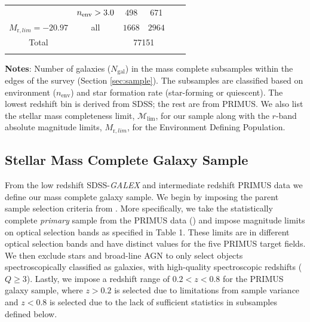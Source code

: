\begin{table}
\begin{center}
\begin{tabular}{cccccc}
                             &$n_{\mathrm{env}} > 3.0 $            &498                       &671                           \\
        $M_{\mathrm{r}, lim} = -20.97$              & all              & $1668$                      & $2964$                          \\ \hline
        Total &      & \multicolumn{2}{c}{77151} & \\ \hline
        \multicolumn{4}{l}{}                                             \\       
    \end{tabular} \par
    \end{center}
    {\bf Notes}: Number of galaxies ($N_{\mathrm{gal}}$) in the mass complete subsamples within the edges of the survey (Section \ref{sec:sample}). The subsamples are classified based on environment ($n_{\mathrm{env}}$) and star formation rate (star-forming or quiescent). The lowest redshift bin is derived from SDSS; the rest are from PRIMUS. We also list the stellar mass completeness limit, $\mathcal{M}_{\mathrm{lim}}$, for our sample along with the $r$-band absolute magnitude limits, $M_{\mathrm{r}, lim}$, for the Environment Defining Population. 
    \bigskip
\end{table}

\subsection{Stellar Mass Complete Galaxy Sample} \label{sec:target} 
From the low redshift SDSS-{\em GALEX} and intermediate redshift
PRIMUS data we define our mass complete galaxy
sample. We begin by imposing the parent sample selection criteria from
\cite{Moustakas:2013aa}. More specifically, we take the statistically
complete {\em primary} sample from the PRIMUS data
(\citealt{Coil:2011aa}) and impose magnitude limits on optical
selection bands as specified in \cite{Moustakas:2013aa} Table 1. These
limits are in different optical selection bands and have distinct
values for the five PRIMUS target fields. We then exclude stars and
broad-line AGN to only select objects spectroscopically classified as
galaxies, with high-quality spectroscopic redshifts ($Q \geq
3$). Lastly, we impose a redshift range of $ 0.2 < z < 0.8$ for the
PRIMUS galaxy sample, where $ z > 0.2$ is selected due to limitations
from sample variance and $ z < 0.8$ is selected due to the lack of
sufficient statistics in subsamples defined below.

